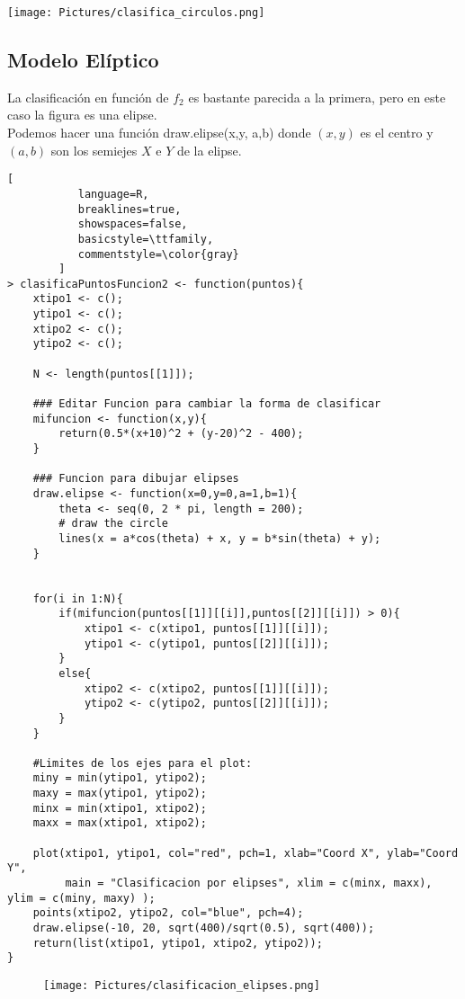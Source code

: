\documentclass[11pt,fleqn]{book} %
\begin{document}
\texttt{[image: Pictures/clasifica\_circulos.png]}
\subsection{Modelo Elíptico}
La clasificación en función de $f_2$ es bastante parecida a la primera, pero en este caso la figura es una elipse.\\
Podemos hacer una función draw.elipse(x,y, a,b) donde $(x,y)$ es el centro y $(a,b)$ son los semiejes $X$ e $Y$ de la elipse.
\begin{lstlisting}[
           language=R,
           breaklines=true,
           showspaces=false,
           basicstyle=\ttfamily,
           commentstyle=\color{gray}
        ]
> clasificaPuntosFuncion2 <- function(puntos){
    xtipo1 <- c();
    ytipo1 <- c();
    xtipo2 <- c();
    ytipo2 <- c();
    
    N <- length(puntos[[1]]);
    
    ### Editar Funcion para cambiar la forma de clasificar
    mifuncion <- function(x,y){
        return(0.5*(x+10)^2 + (y-20)^2 - 400);
    }

    ### Funcion para dibujar elipses
    draw.elipse <- function(x=0,y=0,a=1,b=1){
        theta <- seq(0, 2 * pi, length = 200);
        # draw the circle
        lines(x = a*cos(theta) + x, y = b*sin(theta) + y);
    }
    
    
    for(i in 1:N){
        if(mifuncion(puntos[[1]][[i]],puntos[[2]][[i]]) > 0){
            xtipo1 <- c(xtipo1, puntos[[1]][[i]]);
            ytipo1 <- c(ytipo1, puntos[[2]][[i]]);
        }
        else{
            xtipo2 <- c(xtipo2, puntos[[1]][[i]]);
            ytipo2 <- c(ytipo2, puntos[[2]][[i]]);
        }
    }
    
    #Limites de los ejes para el plot:
    miny = min(ytipo1, ytipo2);
    maxy = max(ytipo1, ytipo2);
    minx = min(xtipo1, xtipo2);
    maxx = max(xtipo1, xtipo2);
    
    plot(xtipo1, ytipo1, col="red", pch=1, xlab="Coord X", ylab="Coord Y", 
         main = "Clasificacion por elipses", xlim = c(minx, maxx), ylim = c(miny, maxy) );
    points(xtipo2, ytipo2, col="blue", pch=4);
    draw.elipse(-10, 20, sqrt(400)/sqrt(0.5), sqrt(400));
    return(list(xtipo1, ytipo1, xtipo2, ytipo2));
}
\end{lstlisting}

\begin{figure}[h]
\texttt{[image: Pictures/clasificacion\_elipses.png]}
\end{figure}
\end{document}
